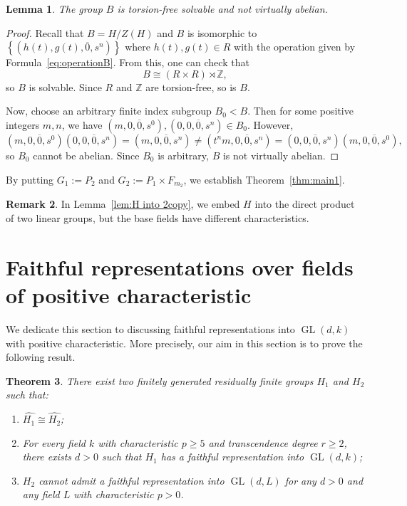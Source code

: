 \documentclass[11pt]{amsart}
\newtheorem{thm}{Theorem}[section]
\newtheorem{lem}[thm]{Lemma}
\theoremstyle{definition}
\newtheorem{rmk}[thm]{Remark}
\DeclareMathOperator{\GL}{GL}
\newcommand{\ZZ}{\mathbb{Z}}
\begin{document}
 \begin{lem} \label{lem:PropertyofB}
 The group $B$ is torsion-free solvable and not virtually abelian.
 \end{lem}
 \begin{proof}
 Recall that $B=H/Z(H)$ and $B$ is isomorphic to $\left \{ (h(t),g(t),\overline{0},s^n) \right \}$ where $h(t),g(t) \in R$ with the operation given by Formula~\eqref{eq:operationB}.
 From this, one can check that $$B \cong (R \times R) \rtimes \ZZ,$$
 so $B$ is solvable.
 Since $R$ and $\ZZ$ are torsion-free, so is $B$.

 Now, choose an arbitrary finite index subgroup $B_0<B$.
 Then for some positive integers $m,n$, we have $(m,0,\overline{0},s^0), (0,0,\overline{0},s^n) \in B_0$.
 However,
 $$ (m,0,\overline{0},s^0)(0,0,\overline{0},s^n) = (m,0,\overline{0},s^n)
 \neq (t^nm,0,\overline{0},s^n) = (0,0,\overline{0},s^n)(m,0,\overline{0},s^0), $$
 so $B_0$ cannot be abelian.
 Since $B_0$ is arbitrary, $B$ is not virtually abelian.
 \end{proof}

 By putting $G_1:=P_2$ and $G_2:=P_1 \times F_{m_2}$, we establish Theorem~\ref{thm:main1}.

 \begin{rmk}
 In Lemma~\ref{lem:H into 2copy}, we embed $H$ into the direct product of two linear groups, but the base fields have different characteristics.
 \end{rmk}
 

\section{Faithful representations over fields of positive characteristic} \label{sec:main2}

 We dedicate this section to discussing faithful representations into $\GL(d,k)$ with positive characteristic.
 More precisely, our aim in this section is to prove the following result.
 
\begin{thm} \label{thm:main2}
There exist two finitely generated residually finite groups $H_1$ and $H_2$ such that:
\begin{enumerate}[label=(\arabic*)]
  \item $\widehat{H_1} \cong \widehat{H_2}$;
  \item For every field $k$ with characteristic $p \geq 5$ and transcendence degree $r \geq 2$,
there exists $d>0$ such that $H_1$ has a faithful representation into $\GL(d,k)$;
  \item $H_2$ cannot admit a faithful representation into $\GL(d,L)$ for any $d>0$ and any field $L$ with characteristic $p > 0$.
\end{enumerate}
\end{thm}
\end{document}
